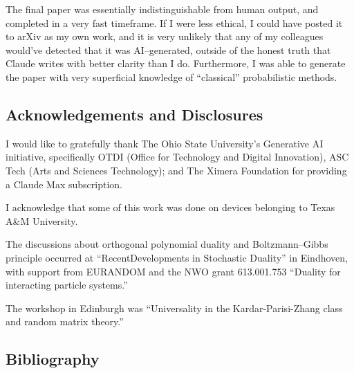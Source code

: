 \documentclass{article}
\begin{document}
The final paper was essentially indistinguishable from human output, and completed in a very fast timeframe. If I were less ethical, I could have posted it to arXiv as my own work, and it is very unlikely that any of my colleagues would've detected that it was AI--generated, outside of the honest truth that Claude writes with better clarity than I do. Furthermore, I was able to generate the paper with very superficial knowledge of ``classical'' probabilistic methods. 

\subsection{Acknowledgements and Disclosures}


I would like to gratefully thank The Ohio State University’s Generative AI initiative, specifically OTDI (Office for Technology and Digital Innovation), ASC Tech (Arts and Sciences Technology); and  The Ximera Foundation for providing a Claude Max subscription.

I acknowledge that some of this work was done on devices belonging to Texas A\&M University.

The discussions about orthogonal polynomial duality and Boltzmann--Gibbs principle occurred at “RecentDevelopments in Stochastic Duality” in Eindhoven, with support from EURANDOM and the NWO grant 613.001.753 “Duality for interacting particle systems.” 

The workshop in Edinburgh was ``Universality in the Kardar-Parisi­-Zhang class and random matrix theory.''



\subsection{Bibliography}
\end{document}
